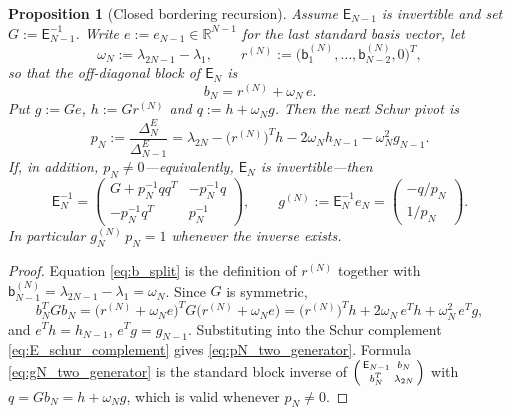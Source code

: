\documentclass[11pt]{amsart}
\numberwithin{equation}{section}
\theoremstyle{plain}
\newtheorem{proposition}[theorem]{Proposition}
\theoremstyle{definition}
\theoremstyle{remark}
\newcommand{\E}{\mathsf E}
\begin{document}
\begin{proposition}[Closed bordering recursion]
\label{prop:closed_bordering}
Assume $\E_{N-1}$ is invertible and set $G:=\E_{N-1}^{-1}$.  Write $e:=e_{N-1}\in\mathbb R^{N-1}$
for the last standard basis vector, let
\begin{equation}
 \omega_N:=\lambda_{2N-1}-\lambda_1,
 \qquad
 r^{(N)}:=\bigl(\mathsf b^{(N)}_1,\dots,\mathsf b^{(N)}_{N-2},0\bigr)^T,
 \label{eq:omegaN_and_r}
\end{equation}
so that the off-diagonal block of $\E_N$ is
\begin{equation}
 b_N=r^{(N)}+\omega_N\,e .
 \label{eq:b_split}
\end{equation}
Put $g:=Ge$, $h:=Gr^{(N)}$ and $q:=h+\omega_Ng$.  Then the next Schur pivot is
\begin{equation}
 p_N:=\frac{\Delta_N^E}{\Delta_{N-1}^E}
 =\lambda_{2N}-\bigl(r^{(N)}\bigr)^Th-2\omega_N h_{N-1}-\omega_N^2 g_{N-1}.
 \label{eq:pN_two_generator}
\end{equation}
If, in addition, \(p_N\ne0\)---equivalently, \(\E_N\) is invertible---then
\begin{equation}
 \E_N^{-1}=
 \begin{pmatrix}
 G+p_N^{-1}qq^T & -p_N^{-1}q\\[2pt]
 -p_N^{-1}q^T & p_N^{-1}
 \end{pmatrix},
 \qquad
 g^{(N)}:=\E_N^{-1}e_N=\begin{pmatrix}-q/p_N\\ 1/p_N\end{pmatrix}.
 \label{eq:gN_two_generator}
\end{equation}
In particular \(g^{(N)}_N\,p_N=1\) whenever the inverse exists.
\end{proposition}

\begin{proof}
Equation \eqref{eq:b_split} is the definition of $r^{(N)}$ together with
$\mathsf b^{(N)}_{N-1}=\lambda_{2N-1}-\lambda_1=\omega_N$.  Since $G$ is symmetric,
\begin{equation}
 b_N^TGb_N
 =\bigl(r^{(N)}+\omega_Ne\bigr)^TG\bigl(r^{(N)}+\omega_Ne\bigr)
 =\bigl(r^{(N)}\bigr)^Th+2\omega_N\,e^Th+\omega_N^2\,e^Tg,
\end{equation}
and $e^Th=h_{N-1}$, $e^Tg=g_{N-1}$.  Substituting into the Schur complement
\eqref{eq:E_schur_complement} gives \eqref{eq:pN_two_generator}.  Formula
\eqref{eq:gN_two_generator} is the standard block inverse of
$\begin{psmallmatrix}\E_{N-1}&b_N\\b_N^T&\lambda_{2N}\end{psmallmatrix}$ with
$q=Gb_N=h+\omega_Ng$, which is valid whenever $p_N\ne0$.
\end{proof}
\end{document}
